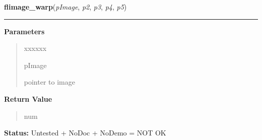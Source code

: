 \hspace{.8\funcindent}\begin{boxedminipage}{\funcwidth}

    \raggedright \textbf{flimage\_warp}(\textit{pImage}, \textit{p2}, \textit{p3}, \textit{p4}, \textit{p5})

    \vspace{-1.5ex}

    \rule{\textwidth}{0.5\fboxrule}
\setlength{\parskip}{2ex}
\setlength{\parskip}{1ex}
      \textbf{Parameters}
      \vspace{-1ex}

      \begin{quote}
        \begin{Ventry}{xxxxxx}

          \item[pImage]

          pointer to image

        \end{Ventry}

      \end{quote}

      \textbf{Return Value}
    \vspace{-1ex}

      \begin{quote}
      num

      \end{quote}

\textbf{Status:} Untested + NoDoc + NoDemo = NOT OK



    \end{boxedminipage}

    \label{xformslib:library:flimage_autocrop}

    \vspace{0.5ex}

